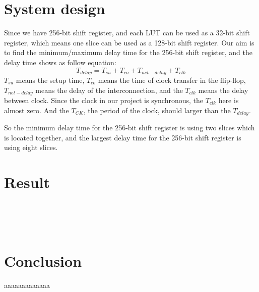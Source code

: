 \documentclass[12pt]{article}
\begin{document}
\section{System design}  \label{a3}
Since we have 256-bit shift register, and each LUT can be used as a 32-bit shift register, which means one slice can be used as a 128-bit shift register. Our aim is to find the minimum/maximum delay time for the 256-bit shift register, and the delay time shows as follow equation:
$$T_{delay}=T_{su}+T_{co}+T_{net-delay}+T_{clk}$$
$T_{su}$ means the setup time, $T_{co}$ means the time of clock transfer in the flip-flop, $T_{net-delay}$ means the delay of the interconnection, and the $T_{clk}$ means the delay between clock. Since the clock in our project is synchronous, the $T_{clk}$ here is almost zero. And the $T_{CK}$, the period of the clock, should larger than the $T_{delay}$.

So the minimum delay time for the 256-bit shift register is using two slices which is located together, and the largest delay time for the 256-bit shift register is using eight slices.
 

\section{Result}  \label{a4}

\lipsum[1]\\
\lipsum[1]\\
\lipsum[1]\\

\section{Conclusion}  \label{a5}
aaaaaaaaaaaaa
\newpage


\end{document}
